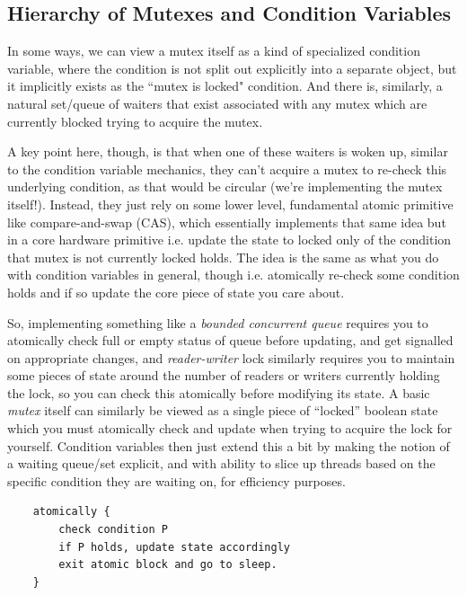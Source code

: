 \documentclass[10pt,a4paper]{article}
\begin{document}
\subsection{Hierarchy of Mutexes and Condition Variables}

In some ways, we can view a mutex itself as a kind of specialized condition variable, where the condition is not split out explicitly into a separate object, but it implicitly exists as the ``mutex is locked" condition. And there is, similarly, a natural set/queue of waiters that exist associated with any mutex which are currently blocked trying to acquire the mutex. 

A key point here, though, is that when one of these waiters is woken up, similar to the condition variable mechanics, they can't acquire a mutex to re-check this underlying condition, as that would be circular (we're implementing the mutex itself!). Instead, they just rely on some lower level, fundamental atomic primitive like compare-and-swap (CAS), which essentially implements that same idea but in a core hardware primitive i.e. update the state to locked only of the condition that mutex is not currently locked holds. The idea is the same as what you do with condition variables in general, though i.e. atomically re-check some condition holds and if so update the core piece of state you care about.

So, implementing something like a \textit{bounded concurrent queue} requires you to atomically check full or empty status of queue before updating, and get signalled on appropriate changes, and \textit{reader-writer} lock similarly requires you to maintain some pieces of state around the number of readers or writers currently holding the lock, so you can check this atomically before modifying its state. A basic \textit{mutex} itself can similarly be viewed as a single piece of ``locked'' boolean state which you must atomically check and update when trying to acquire the lock for yourself. Condition variables then just extend this a bit by making the notion of a waiting queue/set explicit, and with ability to slice up threads based on the specific condition they are waiting on, for efficiency purposes.

\begin{verbatim}
    atomically {
        check condition P
        if P holds, update state accordingly
        exit atomic block and go to sleep.
    }
\end{verbatim}
\end{document}
